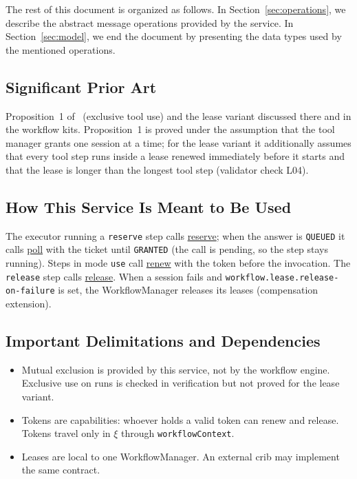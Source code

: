 \documentclass[a4paper]{arrowhead}
\newcommand{\oref}[1]{{\textcolor{ArrowheadBlue}{\hyperref[sec:operations:#1]{#1}}}}
\begin{document}
The rest of this document is organized as follows.
In Section~\ref{sec:operations}, we describe the abstract message operations provided by the service.
In Section~\ref{sec:model}, we end the document by presenting the data types used by the mentioned operations.

\subsection{Significant Prior Art}
Proposition~1 of~\cite{varga2026} (exclusive tool use) and the lease variant discussed there and in
the workflow kits. Proposition~1 is proved under the assumption that the tool manager grants one session at a time; for
the lease variant it additionally assumes that every tool step runs inside a lease renewed immediately before it starts
and that the lease is longer than the longest tool step (validator check L04).

\subsection{How This Service Is Meant to Be Used}
The executor running a \texttt{reserve} step calls \oref{reserve}; when the answer is \texttt{QUEUED} it calls
\oref{poll} with the ticket until \texttt{GRANTED} (the call is pending, so the step stays running). Steps in mode
\texttt{use} call \oref{renew} with the token before the invocation. The \texttt{release} step calls \oref{release}.
When a session fails and \texttt{workflow.lease.release-on-failure} is set, the WorkflowManager releases its leases
(compensation extension).

\subsection{Important Delimitations and Dependencies}
\label{sec:delimitations}
\begin{itemize}
\item Mutual exclusion is provided by this service, not by the workflow engine. Exclusive use on runs is checked in verification but not proved for the lease variant.
\item Tokens are capabilities: whoever holds a valid token can renew and release. Tokens travel only in $\xi$ through \texttt{workflowContext}.
\item Leases are local to one WorkflowManager. An external crib may implement the same contract.
\end{itemize}
\end{document}

